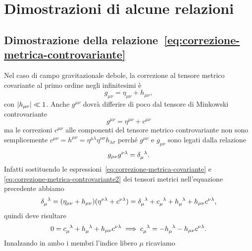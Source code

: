 \cleardoublepage
\chapter{Dimostrazioni di alcune relazioni}
\label{cha:dimostrazioni}

\section{Dimostrazione della
  relazione~\texorpdfstring{\eqref{eq:correzione-metrica-controvariante}}
  {(2.33)}}
\label{sec:dimostr-correz-metrica-controvariante}

Nel caso di campo gravitazionale debole, la correzione al tensore metrico
covariante al primo ordine negli infinitesimi è
\begin{equation}
  \label{eq:correzione-metrica-covariante}
  g_{\mu\nu} = \eta_{\mu\nu} + h_{\mu\nu},
\end{equation}
con $\lvert h_{\mu\nu}\rvert \ll 1$.  Anche $g^{\mu\nu}$ dovrà differire di poco dal
tensore di Minkowski controvariante
\begin{equation}
    \label{eq:correzione-metrica-controvariante2}
  g^{\mu\nu} = \eta^{\mu\nu} + c^{\mu\nu}
\end{equation}
ma le correzioni $c^{\mu\nu}$ alle componenti del tensore metrico controvariante
non sono semplicemente
$c^{\mu\nu} = h^{\mu\nu} = \eta^{\mu\lambda}\eta^{\nu\sigma} h_{\lambda\sigma}$
perché $g^{\mu\nu}$ e $g_{\mu\nu}$ sono legati dalla relazione
\begin{equation}
  g_{\mu\nu}g^{\nu\lambda} = \tensor{\delta}{_{\mu}^{\lambda}}.
\end{equation}
Infatti sostituendo le espressioni~\eqref{eq:correzione-metrica-covariante} e
\eqref{eq:correzione-metrica-controvariante2} dei tensori metrici nell'equazione
precedente abbiamo
\begin{equation}
  \tensor{\delta}{_{\mu}^{\lambda}} = (\eta_{\mu\nu} +
  h_{\mu\nu})(\eta^{\nu\lambda} + c^{\nu\lambda}) =
  \tensor{\delta}{_{\mu}^{\lambda}} + \tensor{c}{_{\mu}^{\lambda}} +
  \tensor{h}{_{\mu}^{\lambda}} + h_{\mu\nu}c^{\nu\lambda},
\end{equation}
quindi deve risultare
\begin{equation}
  0 = \tensor{c}{_{\mu}^{\lambda}} + \tensor{h}{_{\mu}^{\lambda}} +
  h_{\mu\nu}c^{\nu\lambda} \implies \tensor{c}{_{\mu}^{\lambda}} =
  -\tensor{h}{_{\mu}^{\lambda}} - h_{\mu\nu}c^{\nu\lambda}.
\end{equation}
Innalzando in ambo i membri l'indice libero $\mu$ ricaviamo
